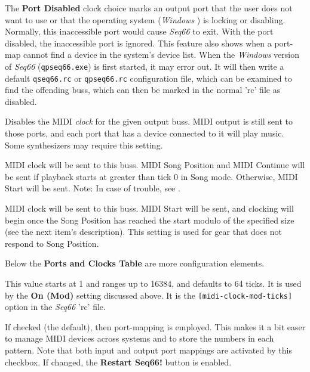    The \textbf{Port Disabled} clock choice marks an output port
   that the user does not want to use or that the operating system
   (\textsl{Windows} \smiley)
   is locking or disabling.
   Normally, this inaccessible port would cause \textsl{Seq66} to exit.
   With the port disabled, the inaccessible port is ignored.
   This feature also shows when a port-map cannot find a device in the system's
   device list.
   When the \textsl{Windows} version of \textsl{Seq66}
   (\texttt{qpseq66.exe}) is first started, it may error out.
   It will then write a default \texttt{qseq66.rc}
   or \texttt{qpseq66.rc} configuration file,
   which can be examined to find the offending buss, which can then be
   marked in the normal 'rc' file as disabled.

   Disables the MIDI \textsl{clock} for the given output buss.
   MIDI output is still sent to those ports, and
   each port that has a device connected to it will play music.
   Some synthesizers may require this setting.

   MIDI clock will be sent to this buss.
   MIDI Song Position and MIDI Continue will be sent if playback starts
   at greater than tick 0 in Song mode.  Otherwise, MIDI Start will be sent.
   Note: In case of trouble, see
   .

   MIDI clock will be sent to this buss.
   MIDI Start will be sent, and clocking will begin
   once the Song Position has reached the start modulo of the specified size
   (see the next item's description).
   This setting is used for gear that does not respond to Song Position.

   Below the \textbf{Ports and Clocks Table} are more configuration elements.

   \setcounter{ItemCounter}{0}      %

   This value starts at 1 and ranges up to 16384, and defaults to 64 ticks.
   It is used by the \textbf{On (Mod)} setting discussed above.
   It is the \texttt{[midi-clock-mod-ticks]} option in the \textsl{Seq66}
   'rc' file.

   If checked (the default), then port-mapping is employed.
   This makes it a bit easer to manage MIDI devices across systems and to store
   the numbers in each pattern.
   Note that both input and output port mappings are activated by this
   checkbox.
   If changed, the \textbf{Restart Seq66!} button is enabled.

